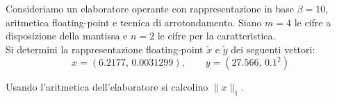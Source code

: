 Consideriamo un elaboratore operante con rappresentazione in base 
$\beta=10$, aritmetica floating-point e tecnica di 
arrotondamento. Siano $m=4$ le cifre a disposizione
della mantissa e $n=2$ le cifre per la caratteristica.\\

\noindent Si determini la rappresentazione floating-point 
$\widetilde{x}$ e $\widetilde{y}$ dei seguenti vettori:
\[ x=(6.2177,\,  0.0031299), \quad \quad  y=(27.566, \, 0.1^{2}) \]

\noindent Usando l'aritmetica dell'elaboratore si calcolino $\|x\|_1$.
